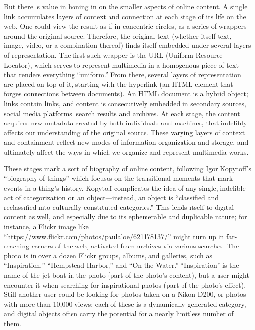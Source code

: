 But there is value in honing in on the smaller aspects of online content. A single link accumulates layers of context and connection at each stage of its life on the web. One could view the result as if in concentric circles, as a series of wrappers around the original source. \autocite{add figures here; one abstract concentric-circle view, one concrete view with a sample webpage} Therefore, the original text (whether itself text, image, video, or a combination thereof) finds itself embedded under several layers of representation. The first such wrapper is the URL (Uniform Resource Locator), which serves to represent multimedia in a homogenous piece of text that renders everything ``uniform.'' From there, several layers of representation are placed on top of it, starting with the hyperlink (an HTML element that forges connections between documents). An HTML document is a hybrid object; links contain links, and content is consecutively embedded in secondary sources, social media platforms, search results and archives. At each stage, the content acquires new metadata created by both individuals and machines, that indelibly affects our understanding of the original source. These varying layers of context and containment reflect new modes of information organization and storage, and ultimately affect the ways in which we organize and represent multimedia works.

These stages mark a sort of biography of online content, following Igor Kopytoff's ``biography of things'' which focuses on the transitional moments that mark events in a thing's history.  Kopytoff complicates the idea of any single, indelible act of categorization on an object---instead, an object is ``classified and reclassified into culturally constituted categories.''\autocite{kopytoff} This lends itself to digital content as well, and especially due to its ephemerable and duplicable nature; for instance, a Flickr image like ``https://www.flickr.com/photos/paulaloe/621178137/'' might turn up in far-reaching corners of the web, activated from archives via various searches. The photo is in over a dozen Flickr groups, albums, and galleries, such as ``Inspiration,'' ``Hempstead Harbor,'' and ``On the Water.'' ``Inspiration'' is the name of the jet boat in the photo (part of the photo's content), but a user might encounter it when searching for inspirational photos (part of the photo's effect). Still another user could be looking for photos taken on a Nikon D200, or photos with more than 10,000 views; each of these is a dynamically generated category, and digital objects often carry the potential for a nearly limitless number of them.

